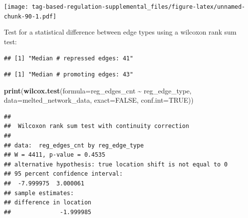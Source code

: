 \documentclass[
]{book}
\newenvironment{Shaded}{\begin{snugshade}}{\end{snugshade}}
\newcommand{\DataTypeTok}[1]{\textcolor[rgb]{0.13,0.29,0.53}{#1}}
\newcommand{\KeywordTok}[1]{\textcolor[rgb]{0.13,0.29,0.53}{\textbf{#1}}}
\newcommand{\NormalTok}[1]{#1}
\newcommand{\OperatorTok}[1]{\textcolor[rgb]{0.81,0.36,0.00}{\textbf{#1}}}
\newcommand{\OtherTok}[1]{\textcolor[rgb]{0.56,0.35,0.01}{#1}}
\newcommand{\StringTok}[1]{\textcolor[rgb]{0.31,0.60,0.02}{#1}}
\begin{document}
\texttt{[image: tag-based-regulation-supplemental\_files/figure-latex/unnamed-chunk-90-1.pdf]}

Test for a statistical difference between edge types using a wilcoxon rank sum test:

\begin{Shaded}
\end{Shaded}

\begin{verbatim}
## [1] "Median # repressed edges: 41"
\end{verbatim}

\begin{Shaded}
\end{Shaded}

\begin{verbatim}
## [1] "Median # promoting edges: 43"
\end{verbatim}

\begin{Shaded}
\begin{Highlighting}[]
\KeywordTok{print}\NormalTok{(}\KeywordTok{wilcox.test}\NormalTok{(}\DataTypeTok{formula=}\NormalTok{reg\_edges\_cnt }\OperatorTok{\textasciitilde{}}\StringTok{ }\NormalTok{reg\_edge\_type, }\DataTypeTok{data=}\NormalTok{melted\_network\_data, }\DataTypeTok{exact=}\OtherTok{FALSE}\NormalTok{, }\DataTypeTok{conf.int=}\OtherTok{TRUE}\NormalTok{))}
\end{Highlighting}
\end{Shaded}

\begin{verbatim}
## 
##  Wilcoxon rank sum test with continuity correction
## 
## data:  reg_edges_cnt by reg_edge_type
## W = 4411, p-value = 0.4535
## alternative hypothesis: true location shift is not equal to 0
## 95 percent confidence interval:
##  -7.999975  3.000061
## sample estimates:
## difference in location 
##              -1.999985
\end{verbatim}
\end{document}
